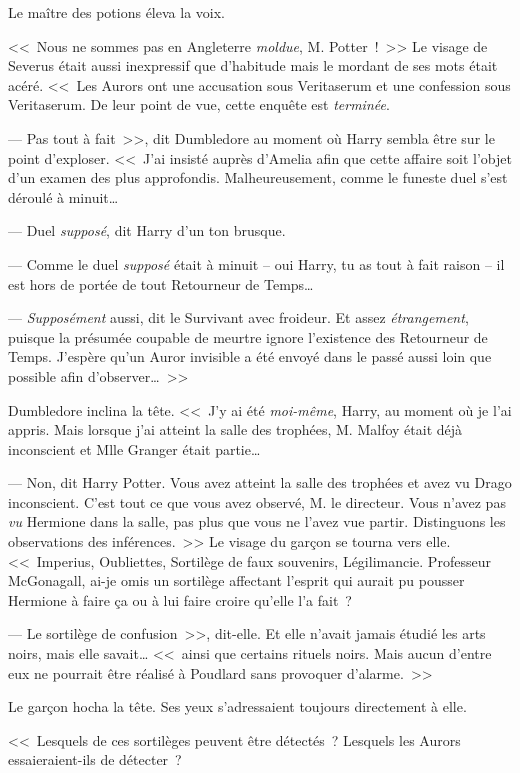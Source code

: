 Le maître des potions éleva la voix.

<<~Nous ne sommes pas en Angleterre \emph{moldue}, M. Potter~!~>> Le visage de Severus était aussi inexpressif que d'habitude mais le mordant de ses mots était acéré. <<~Les Aurors ont une accusation sous Veritaserum et une confession sous Veritaserum. De leur point de vue, cette enquête est \emph{terminée}.

--- Pas tout à fait~>>, dit Dumbledore au moment où Harry sembla être sur le point d'exploser. <<~J'ai insisté auprès d'Amelia afin que cette affaire soit l'objet d'un examen des plus approfondis. Malheureusement, comme le funeste duel s'est déroulé à minuit…

--- Duel \emph{supposé}, dit Harry d'un ton brusque.

--- Comme le duel \emph{supposé} était à minuit -- oui Harry, tu as tout à fait raison -- il est hors de portée de tout Retourneur de Temps…

--- \emph{Supposément} aussi, dit le Survivant avec froideur. Et assez \emph{étrangement}, puisque la présumée coupable de meurtre ignore l'existence des Retourneur de Temps. J'espère qu'un Auror invisible a été envoyé dans le passé aussi loin que possible afin d'observer…~>>

Dumbledore inclina la tête. <<~J'y ai été \emph{moi-même}, Harry, au moment où je l'ai appris. Mais lorsque j'ai atteint la salle des trophées, M. Malfoy était déjà inconscient et Mlle Granger était partie…

--- Non, dit Harry Potter. Vous avez atteint la salle des trophées et avez vu Drago inconscient. C'est tout ce que vous avez observé, M. le directeur. Vous n'avez pas \emph{vu} Hermione dans la salle, pas plus que vous ne l'avez vue partir. Distinguons les observations des inférences.~>> Le visage du garçon se tourna vers elle. <<~Imperius, Oubliettes, Sortilège de faux souvenirs, Légilimancie. Professeur McGonagall, ai-je omis un sortilège affectant l'esprit qui aurait pu pousser Hermione à faire ça ou à lui faire croire qu'elle l'a fait~?

--- Le sortilège de confusion~>>, dit-elle. Et elle n'avait jamais étudié les arts noirs, mais elle savait… <<~ainsi que certains rituels noirs. Mais aucun d'entre eux ne pourrait être réalisé à Poudlard sans provoquer d'alarme.~>>

Le garçon hocha la tête. Ses yeux s'adressaient toujours directement à elle.

<<~Lesquels de ces sortilèges peuvent être détectés~? Lesquels les Aurors essaieraient-ils de détecter~?

